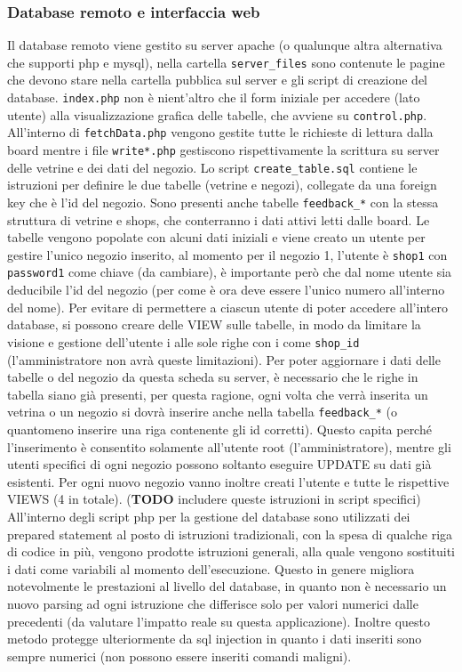 \documentclass{article}
\begin{document}
\subsubsection{Database remoto e interfaccia web}
Il database remoto viene gestito su server apache (o qualunque altra alternativa che supporti php e mysql), nella cartella \texttt{server\_files} sono contenute le pagine che devono stare nella cartella pubblica sul server e gli script di creazione del database. \texttt{index.php} non \`{e} nient'altro che il form iniziale per accedere (lato utente) alla visualizzazione grafica delle tabelle, che avviene su \texttt{control.php}. All'interno di \texttt{fetchData.php} vengono gestite tutte le richieste di lettura dalla board mentre i file \texttt{write*.php} gestiscono rispettivamente la scrittura su server delle vetrine e dei dati del negozio.
Lo script \texttt{create\_table.sql} contiene le istruzioni per definire le due tabelle (vetrine e negozi), collegate da una foreign key che \`{e} l'id del negozio. Sono presenti anche tabelle \texttt{feedback\_*} con la stessa struttura di vetrine e shops, che conterranno i dati attivi letti dalle board.
Le tabelle vengono popolate con alcuni dati iniziali e viene creato un utente per gestire l'unico negozio inserito, al momento per il negozio 1, l'utente \`{e} \texttt{shop1} con \texttt{password1} come chiave (da cambiare), \`{e} importante per\`{o} che dal nome utente sia deducibile l'id del negozio (per come \`{e} ora deve essere l'unico numero all'interno del nome). Per evitare di permettere a ciascun utente di poter accedere all'intero database, si possono creare delle VIEW sulle tabelle, in modo da limitare la visione e gestione dell'utente i alle sole righe con i come \texttt{shop\_id} (l'amministratore non avr\`{a} queste limitazioni).
Per poter aggiornare i dati delle tabelle o del negozio da questa scheda su server, \`{e} necessario che le righe in tabella siano gi\`{a} presenti, per questa ragione, ogni volta che verr\`{a} inserita un vetrina o un negozio si dovr\`{a} inserire anche nella tabella \texttt{feedback\_*} (o quantomeno inserire una riga contenente gli id corretti). Questo capita perch\'{e} l'inserimento \`{e} consentito solamente all'utente root (l'amministratore), mentre gli utenti specifici di ogni negozio possono soltanto eseguire UPDATE su dati gi\`{a} esistenti. Per ogni nuovo negozio vanno inoltre creati l'utente e tutte le rispettive VIEWS (4 in totale). (\textbf{TODO} includere queste istruzioni in script specifici) 
All'interno degli script php per la gestione del database sono utilizzati dei prepared statement al posto di istruzioni tradizionali, con la spesa di qualche riga di codice in pi\`{u}, vengono prodotte istruzioni generali, alla quale vengono sostituiti i dati come variabili al momento dell'esecuzione. Questo in genere migliora notevolmente le prestazioni al livello del database, in quanto non \`{e} necessario un nuovo parsing ad ogni istruzione che differisce solo per valori numerici dalle precedenti (da valutare l'impatto reale su questa applicazione). Inoltre questo metodo protegge ulteriormente da sql injection in quanto i dati inseriti sono sempre numerici (non possono essere inseriti comandi maligni).
\end{document}
